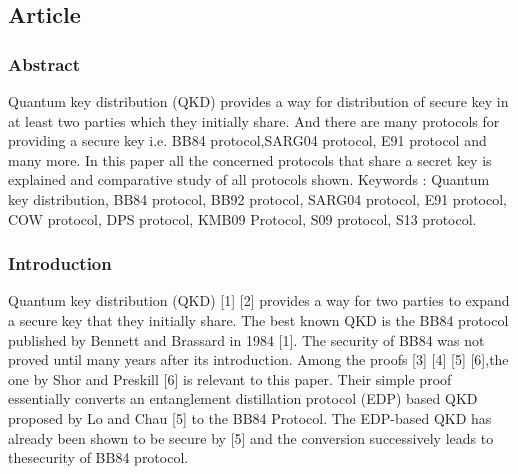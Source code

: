 \subsection{Article}

\subsubsection*{Abstract}

Quantum key distribution (QKD) provides a way for distribution of secure key in at least two parties which they initially share. And there are many protocols for providing a secure key i.e. BB84 protocol,SARG04 protocol, E91 protocol and many more. In this paper all the concerned protocols that share a secret key is explained and comparative study of all protocols shown.
Keywords : Quantum key distribution, BB84 protocol, BB92 protocol, SARG04 protocol, E91 protocol, COW protocol, DPS protocol, KMB09 Protocol, S09 protocol, S13 protocol.

\subsubsection{Introduction}

Quantum key distribution (QKD) [1] [2] provides a way for two parties to expand a secure key that they initially share. The best known QKD is the BB84 protocol published by Bennett and Brassard in 1984 [1]. The security of BB84 was not proved until many years after its introduction. Among the proofs [3] [4] [5] [6],the one by Shor and Preskill [6] is relevant to this paper. Their simple proof essentially converts an entanglement distillation protocol (EDP) based QKD proposed by Lo and Chau [5] to the BB84 Protocol. The EDP-based QKD has already been shown to be secure by [5] and the conversion successively leads to thesecurity of BB84 protocol.

